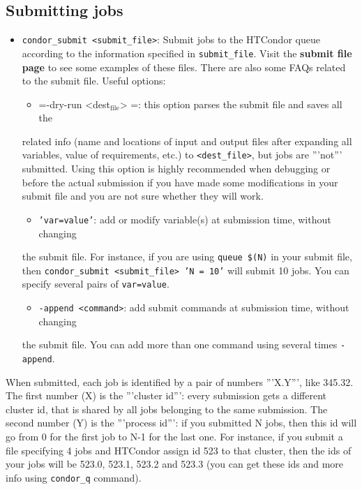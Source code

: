 \documentclass[a4paper,10pt]{article}
\begin{document}
\subsection{Submitting jobs}
\label{sec:orgccd427c}

\begin{itemize}
\item \texttt{condor\_submit <submit\_file>}: Submit jobs to the HTCondor queue according to
the information specified in \texttt{submit\_file}. Visit the \textbf{submit file page} to
see some examples of these files. There are also some FAQs related to the
submit file. Useful options:

\begin{itemize}
\item =-dry-run <dest\(_{\text{file}}\)> =: this option parses the submit file and saves all the
\end{itemize}
related info (name and locations of input and output files after expanding all
variables, value of requirements, etc.) to \texttt{<dest\_file>}, but jobs are '''not'''
submitted. Using this option is highly recommended when debugging or before the
actual submission if you have made some modifications in your submit file and
you are not sure whether they will work.

\begin{itemize}
\item \texttt{'var=value'}: add or modify variable(s) at submission time, without changing
\end{itemize}
the submit file. For instance, if you are using \texttt{queue \$(N)} in your submit
file, then \texttt{condor\_submit <submit\_file> 'N = 10'} will submit 10 jobs. You can
specify several pairs of \texttt{var=value}.

\begin{itemize}
\item \texttt{-append <command>}: add submit commands at submission time, without changing
\end{itemize}
the submit file. You can add more than one command using several times
\texttt{-append}.
\end{itemize}

When submitted, each job is identified by a pair of numbers '''X.Y''', like
345.32. The first number (X) is the '''cluster id''': every submission gets a
different cluster id, that is shared by all jobs belonging to the same
submission. The second number (Y) is the '''process id''': if you submitted N
jobs, then this id will go from 0 for the first job to N-1 for the last one. For
instance, if you submit a file specifying 4 jobs and HTCondor assign id 523 to
that cluster, then the ids of your jobs will be 523.0, 523.1, 523.2 and 523.3
(you can get these ids and more info using \texttt{condor\_q} command).
\end{document}
